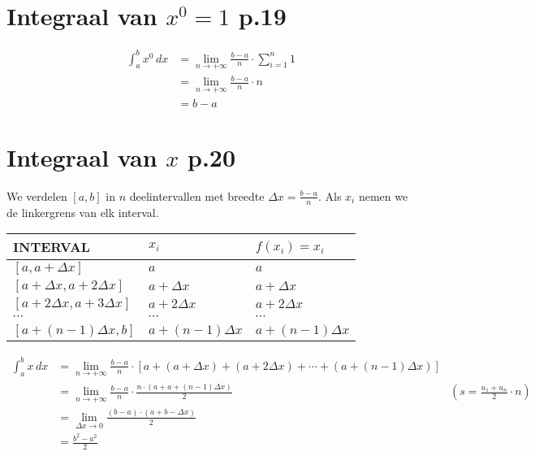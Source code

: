 \documentclass{article}
\theoremstyle{definition}
\begin{document}
\section{Integraal van $x^0 = 1$ p.19}
\begin{align*}
  \displaystyle\int_{a}^{b} x^0 \, dx &= \lim_{n\to + \infty} \frac{b-a}{n}\cdot\sum_{i=1}^{n}1\\
                                     &=\lim_{n\to + \infty}\frac{b-a}{n}\cdot n\\
                                     &=b-a
\end{align*}
\section{Integraal van $x$ p.20}
We verdelen $[a,b]$ in $n$ deelintervallen met breedte $\Delta x = \frac{b-a}{n}.$ Als $x_i$ nemen we de linkergrens van elk interval. 
\begin{center}
  \begin{tabularx}{\textwidth}{| >{\centering\arraybackslash}X | >{\centering\arraybackslash}X | >{\centering\arraybackslash}X|}
    \hline
    INTERVAL & $x_i$ & $f\left(x_i\right) = x_i$\\
    \hline
    \hline
    $\left[a, a+\Delta x\right]$ & $a$ & $a$\\
   \hline
    $\left[a + \Delta x, a+2\Delta x\right]$ & $a+\Delta x$ & $a+\Delta x$\\
    \hline
    $\left[a + 2\Delta x, a+3\Delta x\right]$ & $a+2\Delta x$ & $a+2\Delta x$\\
    \hline
    $\cdots$ &$\cdots$ &$\cdots$\\
    \hline
    $\left[a + \left(n-1\right)\Delta x, b\right]$ & $a+\left(n-1\right)\Delta x$ & $a+\left(n-1\right)\Delta x$\\
    \hline
  \end{tabularx}
\end{center}


\begin{align*}
  \displaystyle\int_{a}^{b}x\,dx &=\lim_{n\to + \infty} \frac{b-a}{n}\cdot\left[a+\left(a+\Delta x\right) + \left(a+2\Delta x\right) + \cdots + \left(a+\left(n-1\right)\Delta x\right)\right]\\
                                 &=\lim_{n\to + \infty}\frac{b-a}{n}\cdot\frac{n\cdot\left(a+a+\left(n-1\right)\Delta x\right)}{2} &\left(s=\frac{u_1+u_n}{2}\cdot n\right)\\
                                 &=\lim_{\Delta x\to 0}\frac{\left(b-a\right)\cdot\left(a+b-\Delta x\right)}{2}\\
                                 &=\frac{b^2-a^2}{2}
\end{align*}
\end{document}
